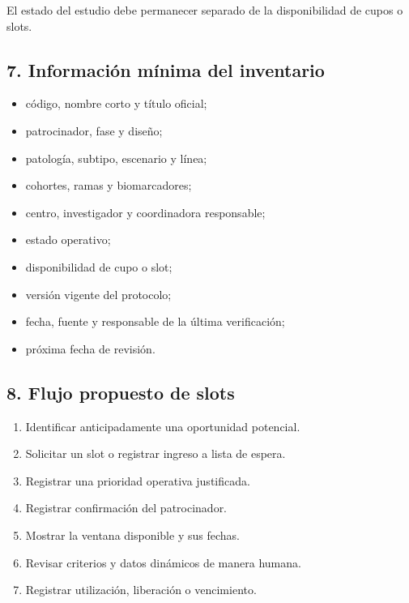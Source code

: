\documentclass[
]{article}
\providecommand{\tightlist}{%
  \setlength{\itemsep}{0pt}\setlength{\parskip}{0pt}}
\begin{document}
El estado del estudio debe permanecer separado de la disponibilidad de
cupos o slots.

\hypertarget{7-informaciuxf3n-muxednima-del-inventario}{%
\subsection{7. Información mínima del
inventario}\label{7-informaciuxf3n-muxednima-del-inventario}}

\begin{itemize}
\tightlist
\item
  código, nombre corto y título oficial;
\item
  patrocinador, fase y diseño;
\item
  patología, subtipo, escenario y línea;
\item
  cohortes, ramas y biomarcadores;
\item
  centro, investigador y coordinadora responsable;
\item
  estado operativo;
\item
  disponibilidad de cupo o slot;
\item
  versión vigente del protocolo;
\item
  fecha, fuente y responsable de la última verificación;
\item
  próxima fecha de revisión.
\end{itemize}

\hypertarget{8-flujo-propuesto-de-slots}{%
\subsection{8. Flujo propuesto de
slots}\label{8-flujo-propuesto-de-slots}}

\begin{enumerate}
\def\labelenumi{\arabic{enumi}.}
\tightlist
\item
  Identificar anticipadamente una oportunidad potencial.
\item
  Solicitar un slot o registrar ingreso a lista de espera.
\item
  Registrar una prioridad operativa justificada.
\item
  Registrar confirmación del patrocinador.
\item
  Mostrar la ventana disponible y sus fechas.
\item
  Revisar criterios y datos dinámicos de manera humana.
\item
  Registrar utilización, liberación o vencimiento.
\end{enumerate}
\end{document}
